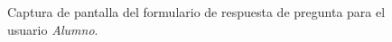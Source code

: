   \begin{figure}[!ht]
    \begin{center}
      \caption{Captura de pantalla del formulario de respuesta de pregunta para el usuario \textit{Alumno}.}
      \label{capturaPantallaResponderPregunta}
    \end{center}
  \end{figure}

